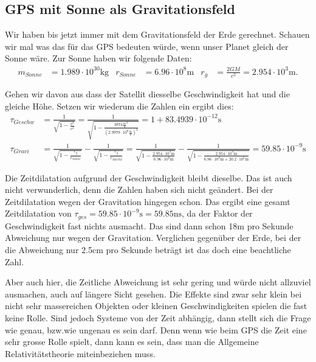 \begin{refsection}
\subsection{GPS mit Sonne als Gravitationsfeld}
Wir haben bis jetzt immer mit dem Gravitationsfeld der Erde gerechnet. Schauen wir mal was das für das GPS bedeuten würde, wenn unser Planet gleich der Sonne wäre. Zur Sonne haben wir folgende Daten:
\begin{align*}
 m_{Sonne} &= 1.989 \cdot 10^30\text{kg} &  r_{Sonne} &= 6.96 \cdot 10^8\text{m} & r_g &= \frac{2GM}{c^2} = 2.954 \cdot 10^3\text{m}. 
\end{align*}

\noindent{}Gehen wir davon aus dass der Satellit diesselbe Geschwindigkeit hat und die gleiche Höhe. Setzen wir wiederum die Zahlen ein ergibt dies:
\begin{align*}
\tau_{Geschw} &= \frac{1}{\sqrt{1 - \frac{v^2}{c^2}}} = \frac{1}{\sqrt{1 - \frac{3874 \frac{\text{m}}{\text{s}}^2}{(2.9979 \cdot 10^8 \frac{\text{m}}{\text{s}} )^2}}} = 1 + 83.4939 \cdot 10^{-12}\text{s}
\\
\tau_{Gravi} &= \frac{1}{\sqrt{1-\frac{r_g}{r_{Sonne}}}} - \frac{1}{\sqrt{1-\frac{r_g}{r_{Satellit}}}} =  
\frac{1}{\sqrt{1-\frac{2.954 \cdot 10^3\text{m}}{6.96 \cdot 10^8\text{m}}}} - \frac{1}{\sqrt{1-\frac{2.954 \cdot 10^3\text{m}}{ 6.96 \cdot 10^8\text{m} + 20.2 \cdot 10^6\text{m}}}} =  59.85 \cdot 10^{-9}\text{s}
\end{align*}

\noindent{}Die Zeitdilatation aufgrund der Geschwindigkeit bleibt dieselbe. Das ist auch nicht verwunderlich, denn die Zahlen haben sich nicht geändert. Bei der Zeitdilatation wegen der Gravitation hingegen schon. Das ergibt eine gesamt Zeitdilatation von \( \tau_{ges} = 59.85 \cdot 10^{-9}\text{s} = 59.85\text{ns} \), da der Faktor der Geschwindigkeit fast nichts ausmacht. Das sind dann schon 18m pro Sekunde Abweichung nur wegen der Gravitation. Verglichen gegenüber der Erde, bei der die Abweichung nur 2.5cm pro Sekunde beträgt ist das doch eine beachtliche Zahl.

Aber auch hier, die Zeitliche Abweichung ist sehr gering und würde nicht allzuviel ausmachen, auch auf längere Sicht gesehen. Die Effekte sind zwar sehr klein bei nicht sehr massereichen Objekten oder kleinen Geschwindigkeiten spielen die fast keine Rolle. Sind jedoch Systeme von der Zeit abhängig, dann stellt sich die Frage wie genau, bzw.wie ungenau es sein darf. Denn wenn wie beim GPS die Zeit eine sehr grosse Rolle spielt, dann kann es sein, dass man die Allgemeine Relativitätstheorie miteinbeziehen muss.


\end{refsection}

